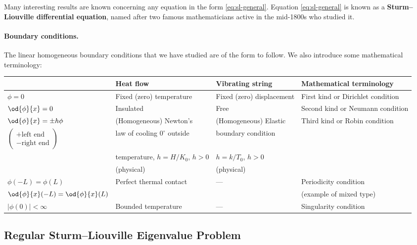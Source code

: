 Many interesting results are known concerning any equation in the form \eqref{eq:sl-general}.  Equation \eqref{eq:sl-general} is known as a \textbf{Sturm--Liouville differential equation}, named after two famous mathematicians active in the mid-1800s who studied it.

\paragraph{Boundary conditions.}
The linear homogeneous boundary conditions that we have studied are of the form to follow.  We also introduce some mathematical terminology:

\begin{table}[H]
\centering
\begin{tabular}{@{}llll@{}}
\toprule
& Heat flow & Vibrating string & Mathematical terminology \\
\midrule
$\phi = 0$ & Fixed (zero) temperature & Fixed (zero) displacement & First kind or Dirichlet condition \\[6pt]
$\displaystyle\od{\phi}{x} = 0$ & Insulated & Free & Second kind or Neumann condition \\[6pt]
$\displaystyle\od{\phi}{x} = \pm h\phi$ & (Homogeneous) Newton's & (Homogeneous) Elastic & Third kind or Robin condition \\
$\begin{pmatrix} +\text{left end} \\ -\text{right end}\end{pmatrix}$ & law of cooling $0^\circ$ outside & boundary condition & \\
& temperature, $h = H/K_0$, $h > 0$ & $h = k/T_0$, $h > 0$ & \\
& (physical) & (physical) & \\[6pt]
$\phi(-L) = \phi(L)$ & Perfect thermal contact & --- & Periodicity condition \\
$\displaystyle\od{\phi}{x}(-L) = \od{\phi}{x}(L)$ & & & (example of mixed type) \\[6pt]
$|\phi(0)| < \infty$ & Bounded temperature & --- & Singularity condition \\
\bottomrule
\end{tabular}
\label{tab:bc-types}
\end{table}

\subsection{Regular Sturm--Liouville Eigenvalue Problem}
\label{subsec:regular-sl}

